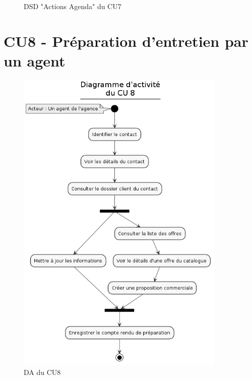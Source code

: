 \begin{figure}[H]
\noindent{}
\caption{DSD "Actions Agenda" du CU7}
\end{figure}

\clearpage
\section{CU8 - Préparation d’entretien par un agent}

\begin{figure}[H]
\centering
\includegraphics[width=10cm]{figures/DA_CU8.png}
\caption{DA du CU8}
\end{figure}


